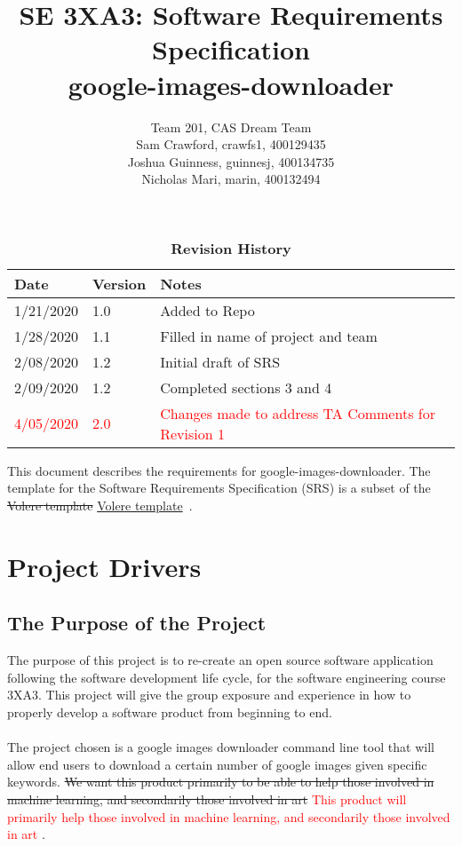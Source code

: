 \documentclass[12pt, titlepage]{article}
\title{SE 3XA3: Software Requirements Specification\\google-images-downloader}
\author{Team 201, CAS Dream Team
		\\ Sam Crawford, crawfs1, 400129435
		\\ Joshua Guinness, guinnesj, 400134735
		\\ Nicholas Mari, marin, 400132494
}
\begin{document}
\maketitle

\tableofcontents
\listoftables

\begin{table}[htp]
\caption{\bf Revision History}
\begin{tabularx}{\textwidth}{p{3cm}p{2cm}X}
\toprule {\bf Date} & {\bf Version} & {\bf Notes}\\
\midrule
1/21/2020 & 1.0 & Added to Repo\\
1/28/2020 & 1.1 & Filled in name of project and team\\
2/08/2020 & 1.2 & Initial draft of SRS \\
2/09/2020 & 1.2 & Completed sections 3 and 4 \\
\textcolor{red}{4/05/2020} & \textcolor{red}{2.0} & \textcolor{red}{Changes made to address TA Comments for Revision 1}\\
\bottomrule
\end{tabularx}
\end{table}

\newpage


This document describes the requirements for google-images-downloader.  The 
template for the Software Requirements Specification (SRS) is a subset of the \st{Volere template} \href{http://www11.informatik.uni-erlangen.de/Lehre/SS2015/PR-SWE/Material/volere-template.pdf}{Volere
template}~\citep{RobertsonAndRobertson2012}.

\section{Project Drivers}

\subsection{The Purpose of the Project}

The purpose of this project is to re-create an open source software application following the software development life cycle, for the software engineering course 3XA3. This project will give the group exposure and experience in how to properly develop a software product from beginning to end.
\\ \\
The project chosen is a google images downloader command line tool that will allow end users to download a certain number of google images given specific keywords. \st{We want this product primarily to be able to help those involved in machine learning, and secondarily those involved in art} \textcolor{red}{This product will primarily help those involved in machine learning, and secondarily those involved in art} .
\end{document}

